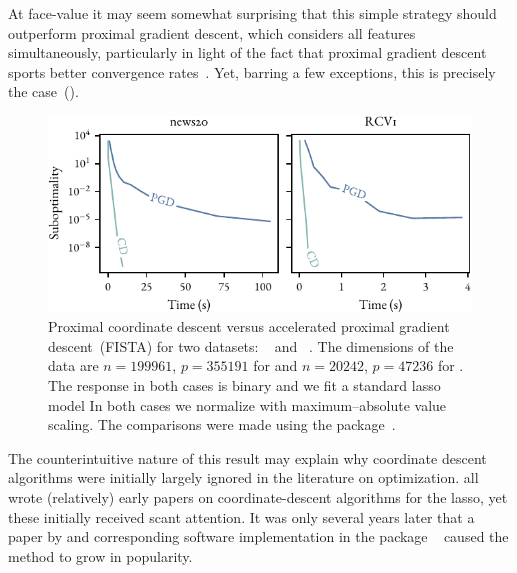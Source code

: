 At face-value it may seem somewhat surprising that this simple strategy should outperform proximal gradient descent, which considers all features simultaneously, particularly in light of the fact that proximal gradient descent sports better convergence rates~\parencite{wright2015}. Yet, barring a few exceptions, this is precisely the case~().

\begin{figure}[htpb]
  \centering
  \includegraphics[]{figures/cd-vs-pgd.pdf}
  \caption{%
    Proximal coordinate descent versus accelerated proximal gradient descent~(FISTA) for two datasets: ~\parencite{keerthi2005} and ~\parencite{lewis2004}. The dimensions of the data are $n=\num{199961}$, $p=\num{355191}$ for  and $n = \num{20242}$,  $p=\num{47236}$ for . The response in both cases is binary and we fit a standard lasso model In both cases we normalize with maximum--absolute value scaling. The comparisons were made using the  package~\parencite{moreau2022a}.
  }
  \label{fig:cd-vs-pgd}
\end{figure}

The counterintuitive nature of this result may explain why coordinate descent algorithms were initially largely ignored in the literature on optimization. \textcite{shevade2003,fu1998a, daubechies2004} all wrote (relatively) early papers on coordinate-descent algorithms for the lasso, yet these initially received scant attention. It was only several years later that a paper by \textcite{friedman2007} and corresponding software implementation in the  package ~\parencite{friedman2010} caused the method to grow in popularity.

